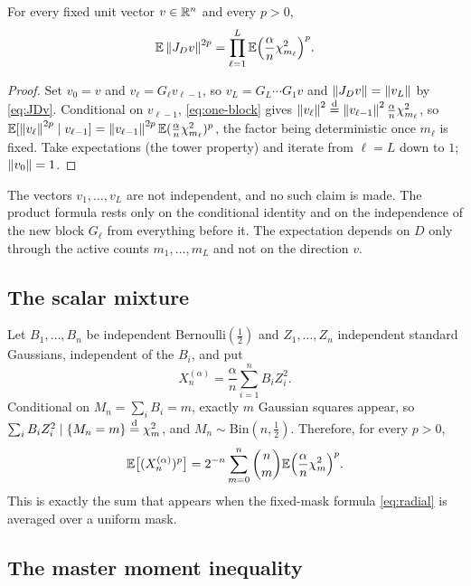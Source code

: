 \begin{lemma}\label{lem:radial}
For every fixed unit vector $v\in\mathbb{R}^n$ and every $p>0$,
\begin{equation}\label{eq:radial}
\mathbb{E}\left\lVert J_Dv\right\rVert^{2p}=\prod_{\ell=1}^L\mathbb{E}\Bigl(\frac\alpha n\chi^2_{m_\ell}\Bigr)^p .
\end{equation}
\end{lemma}

\begin{proof}
Set $v_0=v$ and $v_\ell=G_\ell v_{\ell-1}$, so $v_L=G_L\cdots G_1v$ and $\left\lVert J_Dv\right\rVert=\left\lVert v_L\right\rVert$ by \cref{eq:JDv}. Conditional on $v_{\ell-1}$, \cref{eq:one-block} gives $\left\lVert v_\ell\right\rVert^2\overset{\mathrm{d}}{=}\left\lVert v_{\ell-1}\right\rVert^2\frac\alpha n\chi^2_{m_\ell}$, so $\mathbb{E}[\left\lVert v_\ell\right\rVert^{2p}\mid v_{\ell-1}]=\left\lVert v_{\ell-1}\right\rVert^{2p}\mathbb{E}(\frac\alpha n\chi^2_{m_\ell})^p$, the factor being deterministic once $m_\ell$ is fixed. Take expectations (the tower property) and iterate from $\ell=L$ down to $1$; $\left\lVert v_0\right\rVert=1$.
\end{proof}

The vectors $v_1,\dots,v_L$ are not independent, and no such claim is made. The product formula rests only on the conditional identity and on the independence of the new block $G_\ell$ from everything before it. The expectation depends on $D$ only through the active counts $m_1,\dots,m_L$ and not on the direction $v$.

\subsection{The scalar mixture}

Let $B_1,\dots,B_n$ be independent Bernoulli$(\tfrac12)$ and $Z_1,\dots,Z_n$ independent standard Gaussians, independent of the $B_i$, and put
\begin{equation}\label{eq:X}
X_n^{(\alpha)}=\frac\alpha n\sum_{i=1}^nB_iZ_i^2 .
\end{equation}
Conditional on $M_n=\sum_iB_i=m$, exactly $m$ Gaussian squares appear, so $\sum_iB_iZ_i^2\mid\{M_n=m\}\overset{\mathrm{d}}{=}\chi^2_m$, and $M_n\sim\mathrm{Bin}(n,\tfrac12)$. Therefore, for every $p>0$,
\begin{equation}\label{eq:mixture}
\mathbb{E}\bigl[(X_n^{(\alpha)})^p\bigr]=2^{-n}\sum_{m=0}^n\binom nm\mathbb{E}\Bigl(\frac\alpha n\chi^2_m\Bigr)^p .
\end{equation}
This is exactly the sum that appears when the fixed-mask formula \cref{eq:radial} is averaged over a uniform mask.

\subsection{The master moment inequality}

